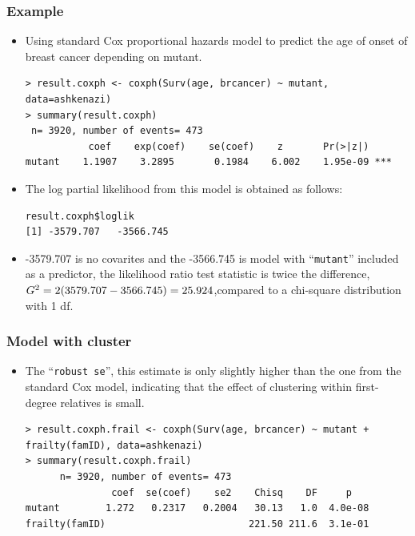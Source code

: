 \documentclass{beamer}
\begin{document}
\pagebreak
\begin{frame}[fragile]
\frametitle{Example}
\begin{itemize}
\item Using standard Cox proportional hazards model to predict the age of onset of breast cancer depending on mutant.
\begin{Verbatim}
> result.coxph <- coxph(Surv(age, brcancer) ~ mutant, 
data=ashkenazi)
> summary(result.coxph)
 n= 3920, number of events= 473
           coef    exp(coef)    se(coef)    z       Pr(>|z|) 
mutant    1.1907    3.2895       0.1984    6.002    1.95e-09 ***
\end{Verbatim}
\item The log partial likelihood from this model is obtained as follows:
\begin{Verbatim}
result.coxph$loglik
[1] -3579.707   -3566.745
\end{Verbatim}
\item -3579.707 is no covarites and the -3566.745 is model with ``\texttt{mutant}'' included as a predictor, the likelihood ratio test statistic is twice the difference, $G^2 = 2(3579.707-3566.745)\linebreak=25.924$,compared to a chi-square distribution with 1 df.
\end{itemize}
\end{frame}

\pagebreak
\begin{frame}[fragile]
\frametitle{Model with cluster}
\begin{itemize}
\begin{Verbatim}
> result.coxph.cluster <- coxph(Surv(age, brcancer) ~ mutant +
cluster(famID), data=ashkenazi)
> summary(result.coxph.cluster)
n= 3920, number of events= 473
         coef   exp(coef)  se(coef)  robust.se   z    Pr(>|z|) 
mutant  1.1907   3.2895     0.1984     0.2023  5.886  3.96e-09 ***
\end{Verbatim}
\item The ``\texttt{robust se}'', this estimate is only slightly higher than the one from the standard Cox model, indicating that the effect of clustering within first-degree relatives is small.
\begin{Verbatim}
> result.coxph.frail <- coxph(Surv(age, brcancer) ~ mutant +
frailty(famID), data=ashkenazi)
> summary(result.coxph.frail)
      n= 3920, number of events= 473
               coef  se(coef)    se2    Chisq    DF     p 
mutant        1.272   0.2317   0.2004   30.13   1.0  4.0e-08
frailty(famID)                         221.50 211.6  3.1e-01
\end{Verbatim}
\end{itemize}
\end{frame}
\end{document}
